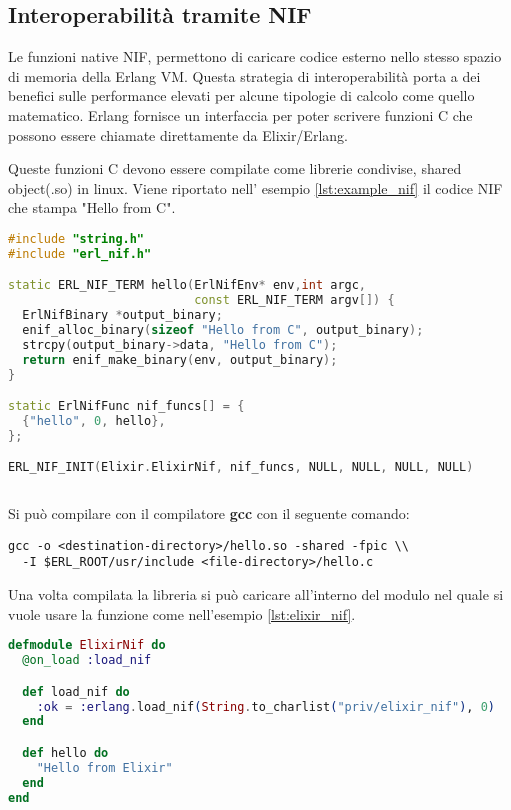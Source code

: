 
\subsection{Interoperabilità tramite NIF}

Le funzioni native NIF, permettono di caricare codice esterno
nello stesso spazio di memoria della Erlang VM. 
Questa strategia di interoperabilità porta a dei benefici
sulle performance elevati per alcune tipologie di calcolo
come quello matematico.
Erlang fornisce un interfaccia \cite{Erlanger73:online}
per poter scrivere funzioni C
che possono essere chiamate direttamente da Elixir/Erlang.

Queste funzioni C devono essere compilate come librerie condivise,
shared object(.so) in linux. Viene riportato
nell' esempio \ref{lst:example_nif} il codice NIF
che stampa "Hello from C"\cite{adoptingElixirchap7pag126}.

\begin{lstlisting}[language=cpp,captionpos=b,
	caption={Funzione Nif},label={lst:example_nif}]
#include "string.h"
#include "erl_nif.h"

static ERL_NIF_TERM hello(ErlNifEnv* env,int argc,
                          const ERL_NIF_TERM argv[]) {
  ErlNifBinary *output_binary;
  enif_alloc_binary(sizeof "Hello from C", output_binary);
  strcpy(output_binary->data, "Hello from C");
  return enif_make_binary(env, output_binary);
}

static ErlNifFunc nif_funcs[] = {
  {"hello", 0, hello},
};

ERL_NIF_INIT(Elixir.ElixirNif, nif_funcs, NULL, NULL, NULL, NULL)
	
\end{lstlisting}

Si può compilare con il compilatore \textbf{gcc}
con il seguente comando:

\begin{lstlisting}[language=none]
gcc -o <destination-directory>/hello.so -shared -fpic \\
  -I $ERL_ROOT/usr/include <file-directory>/hello.c
\end{lstlisting}

Una volta compilata la libreria si può caricare all'interno del
modulo nel quale si vuole usare la funzione come
nell'esempio \ref{lst:elixir_nif}.

\begin{lstlisting}[language=elixir, caption={Caricamento NIF},
	captionpos=b,label={lst:elixir_nif}]
defmodule ElixirNif do
  @on_load :load_nif

  def load_nif do
	:ok = :erlang.load_nif(String.to_charlist("priv/elixir_nif"), 0)
  end

  def hello do
    "Hello from Elixir"
  end
end
\end{lstlisting}


